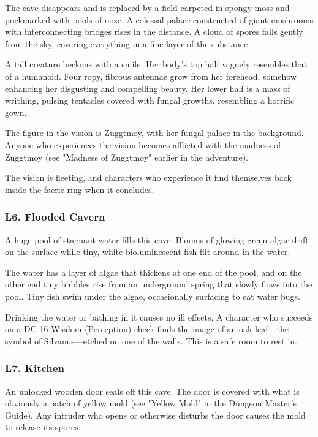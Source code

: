 \documentclass[10pt,a4paper,twoside,bg=print,twocolumn,openany,nodeprecatedcode]{dndbook}
\begin{document}
\begin{DndReadAloud}{}
The cave disappears and is replaced by a field carpeted in spongy moss and pockmarked with pools of ooze. A colossal palace constructed of giant mushrooms with interconnecting bridges rises in the distance. A cloud of spores falls gently from the sky, covering everything in a fine layer of the substance.

A tall creature beckons with a smile. Her body's top half vaguely resembles that of a humanoid. Four ropy, fibrous antennae grow from her forehead, somehow enhancing her disgusting and compelling beauty. Her lower half is a mass of writhing, pulsing tentacles covered with fungal growths, resembling a horrific gown.

\end{DndReadAloud}

The figure in the vision is Zuggtmoy, with her fungal palace in the background. Anyone who experiences the vision becomes afflicted with the madness of Zuggtmoy (see "Madness of Zuggtmoy" earlier in the adventure).

The vision is fleeting, and characters who experience it find themselves back inside the faerie ring when it concludes.

\subsubsection{L6. Flooded Cavern}
\begin{DndReadAloud}{}
A huge pool of stagnant water fills this cave. Blooms of glowing green algae drift on the surface while tiny, white bioluminescent fish flit around in the water.

\end{DndReadAloud}

The water has a layer of algae that thickens at one end of the pool, and on the other end tiny bubbles rise from an underground spring that slowly flows into the pool. Tiny fish swim under the algae, occasionally surfacing to eat water bugs.

Drinking the water or bathing in it causes no ill effects. A character who succeeds on a DC 16 Wisdom (Perception) check finds the image of an oak leaf—the symbol of Silvanus—etched on one of the walls. This is a safe room to rest in.

\subsubsection{L7. Kitchen}
An unlocked wooden door seals off this cave. The door is covered with what is obviously a patch of yellow mold (see "Yellow Mold" in the Dungeon Master's Guide). Any intruder who opens or otherwise disturbs the door causes the mold to release its spores.
\end{document}
